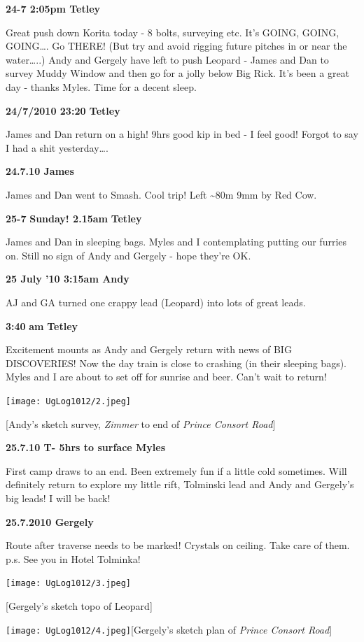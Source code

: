 \textbf{24-7 2:05pm Tetley}

Great push down Korita today - 8 bolts, surveying etc. It's GOING,
GOING, GOING\ldots{}. Go THERE! (But try and avoid rigging future
pitches in or near the water\ldots{}..) Andy and Gergely have left to
push Leopard - James and Dan to survey Muddy Window and then go for a
jolly below Big Rick. It's been a great day - thanks Myles. Time for a
decent sleep.

\textbf{24/7/2010 23:20 Tetley}

James and Dan return on a high! 9hrs good kip in bed - I feel good!
Forgot to say I had a shit yesterday\ldots{}.

\textbf{24.7.10 James}

James and Dan went to Smash. Cool trip! Left \textasciitilde{}80m 9mm by
Red Cow.

\textbf{25-7} \textbf{Sunday! 2.15am} \textbf{Tetley}

James and Dan in sleeping bags. Myles and I contemplating putting our
furries on. Still no sign of Andy and Gergely - hope they're OK.

\textbf{25 July '10 3:15am Andy}

AJ and GA turned one crappy lead (Leopard) into lots of great leads.

\textbf{3:40} \textbf{am} \textbf{Tetley}

Excitement mounts as Andy and Gergely return with news of BIG
DISCOVERIES! Now the day train is close to crashing (in their sleeping
bags). Myles and I are about to set off for sunrise and beer. Can't wait
to return!

\texttt{[image: UgLog1012/2.jpeg]}

{[}Andy's sketch survey, \emph{Zimmer} to end of \emph{Prince Consort
Road}{]}

\textbf{25.7.10 T- 5hrs to surface Myles}

First camp draws to an end. Been extremely fun if a little cold
sometimes. Will definitely return to explore my little rift, Tolminski
lead and Andy and Gergely's big leads! I will be back!

\textbf{25.7.2010 Gergely}

Route after traverse needs to be marked! Crystals on ceiling. Take care
of them. p.s. See you in Hotel Tolminka!

\texttt{[image: UgLog1012/3.jpeg]}

{[}Gergely's sketch topo of Leopard{]}

\texttt{[image: UgLog1012/4.jpeg]}{[}Gergely's sketch plan of
\emph{Prince Consort Road}{]}

